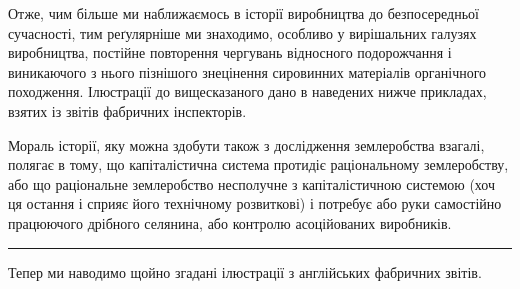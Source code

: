 Отже, чим більше ми наближаємось в історії виробництва
до безпосередньої сучасності, тим реґулярніше ми знаходимо,
особливо у вирішальних галузях виробництва, постійне повторення
чергувань відносного подорожчання і виникаючого з нього
пізнішого знецінення сировинних матеріалів органічного походження.
Ілюстрації до вищесказаного дано в наведених нижче
прикладах, взятих із звітів фабричних інспекторів.

Мораль історії, яку можна здобути також з дослідження землеробства
взагалі, полягає в тому, що капіталістична система
протидіє раціональному землеробству, або що раціональне землеробство
несполучне з капіталістичною системою (хоч ця остання
і сприяє його технічному розвиткові) і потребує або руки самостійно
працюючого дрібного селянина, або контролю асоційованих
виробників.

\pfbreak

Тепер ми наводимо щойно згадані ілюстрації з англійських
фабричних звітів.

